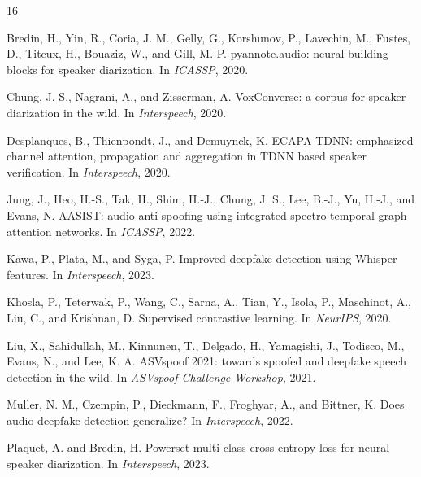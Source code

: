 \documentclass{article}
\begin{document}
\begin{thebibliography}{16}

Bredin, H., Yin, R., Coria, J. M., Gelly, G., Korshunov, P., Lavechin, M.,
Fustes, D., Titeux, H., Bouaziz, W., and Gill, M.-P.
\newblock pyannote.audio: neural building blocks for speaker diarization.
\newblock In \emph{ICASSP}, 2020.

Chung, J. S., Nagrani, A., and Zisserman, A.
\newblock VoxConverse: a corpus for speaker diarization in the wild.
\newblock In \emph{Interspeech}, 2020.

Desplanques, B., Thienpondt, J., and Demuynck, K.
\newblock ECAPA-TDNN: emphasized channel attention, propagation and
aggregation in TDNN based speaker verification.
\newblock In \emph{Interspeech}, 2020.

Jung, J., Heo, H.-S., Tak, H., Shim, H.-J., Chung, J. S., Lee, B.-J., Yu, H.-J.,
and Evans, N.
\newblock AASIST: audio anti-spoofing using integrated spectro-temporal graph
attention networks.
\newblock In \emph{ICASSP}, 2022.

Kawa, P., Plata, M., and Syga, P.
\newblock Improved deepfake detection using Whisper features.
\newblock In \emph{Interspeech}, 2023.

Khosla, P., Teterwak, P., Wang, C., Sarna, A., Tian, Y., Isola, P.,
Maschinot, A., Liu, C., and Krishnan, D.
\newblock Supervised contrastive learning.
\newblock In \emph{NeurIPS}, 2020.

Liu, X., Sahidullah, M., Kinnunen, T., Delgado, H., Yamagishi, J., Todisco, M.,
Evans, N., and Lee, K. A.
\newblock ASVspoof 2021: towards spoofed and deepfake speech detection in the
wild.
\newblock In \emph{ASVspoof Challenge Workshop}, 2021.

Muller, N. M., Czempin, P., Dieckmann, F., Froghyar, A., and Bittner, K.
\newblock Does audio deepfake detection generalize?
\newblock In \emph{Interspeech}, 2022.

Plaquet, A. and Bredin, H.
\newblock Powerset multi-class cross entropy loss for neural speaker
diarization.
\newblock In \emph{Interspeech}, 2023.


\end{thebibliography}
\end{document}
